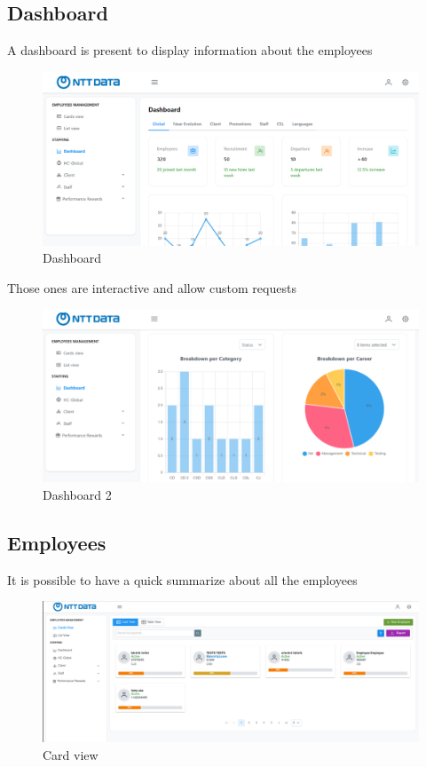 \documentclass[12pt,a4paper,table,english]{article}
\begin{document}
	\subsection{Dashboard}
	A dashboard is present to display information about the employees
	
	\begin{figure}[H]
		\centering
		\includegraphics[width=150mm]{Image/dashboard}
		\caption{Dashboard}
		\label{fig:Dashboard}
	\end{figure}

	Those ones are interactive and allow custom requests

	
	\begin{figure}[H]
		\centering
		\includegraphics[width=150mm]{Image/dashboard2}
		\caption{Dashboard 2}
		\label{fig:Dashboard 2}
	\end{figure}

	\subsection{Employees}
	
	It is possible to have a quick summarize about all the employees
	\begin{figure}[H]
		\centering
		\includegraphics[width=150mm]{Image/cardview}
		\caption{Card view}
		\label{fig:Card view}
	\end{figure}
\end{document}

